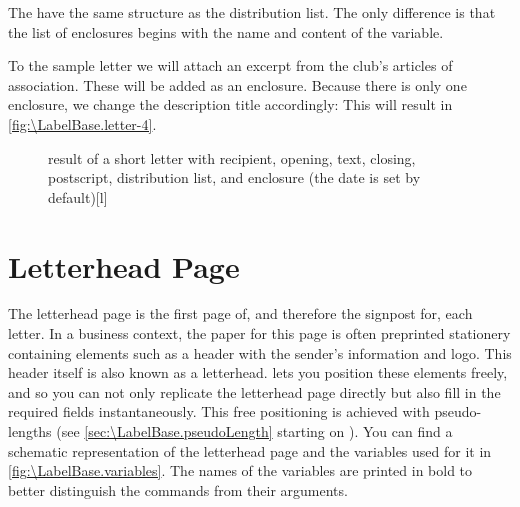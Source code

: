 \begin{Declaration}
\end{Declaration}
The  have the same structure as the distribution list. The
only difference is that the list of enclosures begins with the name and
content of the 
variable.
\begin{Example}
  To the sample letter we will attach an excerpt from the club's articles of
  association. These will be added as an enclosure. Because there is only one
  enclosure, we change the description title accordingly:
  This will result in \autoref{fig:\LabelBase.letter-4}.
  \begin{figure}
    \setcapindent{0pt}%
    \begin{captionbeside}{%
        result of a short letter with recipient, opening, text, closing,
        postscript, distribution list, and enclosure (the date is set by
        default)}[l]
    \end{captionbeside}
    \label{fig:\LabelBase.letter-4}
  \end{figure}
\end{Example}
%
\EndIndexGroup
%
\EndIndexGroup




\section{Letterhead Page}
\BeginIndexGroup
{}%

The letterhead page is the first page of, and therefore the signpost for, each
letter. In a business context, the paper for this page is often preprinted
stationery containing elements such as a header with the sender's information
and logo. This header itself is also known as a letterhead. \KOMAScript{} lets
you position these elements freely, and so you can not only replicate the
letterhead page directly but also fill in the required fields instantaneously.
This free positioning is achieved with pseudo-lengths (see
\autoref{sec:\LabelBase.pseudoLength} starting on
). You can find a schematic
representation of the letterhead page and the variables used for it in
\autoref{fig:\LabelBase.variables}. The names of the variables are printed in
bold to better distinguish the commands from their arguments.

